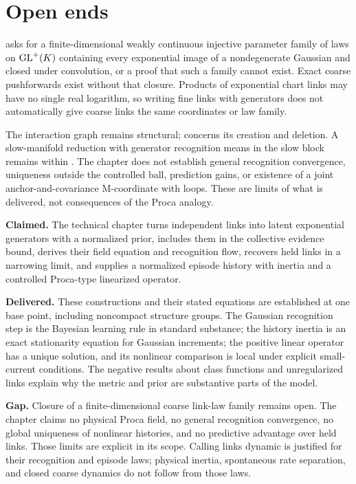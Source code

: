 \section{Open ends}
\label{comp:links-open}

 asks for a finite-dimensional weakly continuous injective
parameter family of laws on $\mathrm{GL}^+(K)$ containing every exponential image of a nondegenerate
Gaussian and closed under convolution, or a proof that such a family cannot exist. Exact
coarse pushforwards exist without that closure. Products of exponential chart links may
have no single real logarithm, so writing fine links with generators does not automatically
give coarse links the same coordinates or law family.

The interaction graph remains structural;  concerns its creation
and deletion. A slow-manifold reduction with generator recognition means in the slow block
remains within . The chapter does not establish general
recognition convergence, uniqueness outside the controlled ball, prediction gains, or
existence of a joint anchor-and-covariance M-coordinate with loops. These are limits of
what is delivered, not consequences of the Proca analogy.

\begin{verdictbox}{\DELIVERED}
\textbf{Claimed.} The technical chapter turns independent links into latent exponential
generators with a normalized prior, includes them in the collective evidence bound,
derives their field equation and recognition flow, recovers held links in a narrowing
limit, and supplies a normalized episode history with inertia and a controlled
Proca-type linearized operator.

\textbf{Delivered.} These constructions and their stated equations are established at
one base point, including noncompact structure groups. The Gaussian recognition step
is the Bayesian learning rule in standard substance; the history inertia is an exact
stationarity equation for Gaussian increments; the positive linear operator has a
unique solution, and its nonlinear comparison is local under explicit small-current
conditions. The negative results about class functions and unregularized links explain
why the metric and prior are substantive parts of the model.

\textbf{Gap.} Closure of a finite-dimensional coarse link-law family remains open.
The chapter claims no physical Proca field, no general recognition convergence, no
global uniqueness of nonlinear histories, and no predictive advantage over held links.
Those limits are explicit in its scope. Calling links dynamic is justified for their
recognition and episode laws; physical inertia, spontaneous rate separation, and closed
coarse dynamics do not follow from those laws.
\end{verdictbox}
